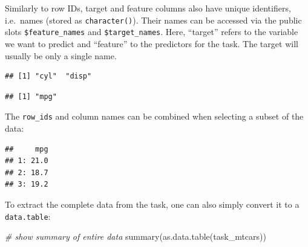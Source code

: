 \documentclass[
]{scrbook}
\newenvironment{Shaded}{\begin{snugshade}}{\end{snugshade}}
\newcommand{\AttributeTok}[1]{\textcolor[rgb]{0.77,0.63,0.00}{#1}}
\newcommand{\CommentTok}[1]{\textcolor[rgb]{0.56,0.35,0.01}{\textit{#1}}}
\newcommand{\DecValTok}[1]{\textcolor[rgb]{0.00,0.00,0.81}{#1}}
\newcommand{\FunctionTok}[1]{\textcolor[rgb]{0.00,0.00,0.00}{#1}}
\newcommand{\NormalTok}[1]{#1}
\newcommand{\SpecialCharTok}[1]{\textcolor[rgb]{0.00,0.00,0.00}{#1}}
\newcommand{\StringTok}[1]{\textcolor[rgb]{0.31,0.60,0.02}{#1}}
\renewenvironment{Shaded} {\begin{snugshade}\small} {\end{snugshade}}
\begin{document}
Similarly to row IDs, target and feature columns also have unique identifiers, i.e.~names (stored as \texttt{character()}).
Their names can be accessed via the public slots \texttt{\$feature\_names} and \texttt{\$target\_names}.
Here, ``target'' refers to the variable we want to predict and ``feature'' to the predictors for the task.
The target will usually be only a single name.

\begin{Shaded}
\end{Shaded}

\begin{verbatim}
## [1] "cyl"  "disp"
\end{verbatim}

\begin{Shaded}
\end{Shaded}

\begin{verbatim}
## [1] "mpg"
\end{verbatim}

The \texttt{row\_ids} and column names can be combined when selecting a subset of the data:

\begin{Shaded}
\end{Shaded}

\begin{verbatim}
##     mpg
## 1: 21.0
## 2: 18.7
## 3: 19.2
\end{verbatim}

To extract the complete data from the task, one can also simply convert it to a \texttt{data.table}:

\begin{Shaded}
\begin{Highlighting}[]
\CommentTok{\# show summary of entire data}
\FunctionTok{summary}\NormalTok{(}\FunctionTok{as.data.table}\NormalTok{(task\_mtcars))}
\end{Highlighting}
\end{Shaded}
\end{document}

